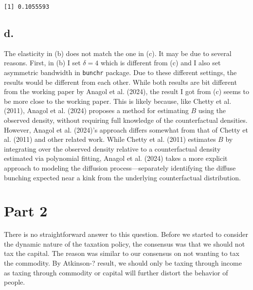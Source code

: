 \documentclass[
  letterpaper,
  DIV=11,
  numbers=noendperiod]{scrartcl}
\newenvironment{Shaded}{\begin{snugshade}}{\end{snugshade}}
\newcommand{\CommentTok}[1]{\textcolor[rgb]{0.37,0.37,0.37}{#1}}
\newcommand{\NormalTok}[1]{\textcolor[rgb]{0.00,0.23,0.31}{#1}}
\newcommand{\SpecialCharTok}[1]{\textcolor[rgb]{0.37,0.37,0.37}{#1}}
\begin{document}
\begin{Shaded}
\end{Shaded}

\begin{verbatim}
[1] 0.1055593
\end{verbatim}

\subsection{d.}\label{d.}

The elasticity in (b) does not match the one in (c). It may be due to
several reasons. First, in (b) I set \(\delta=4\) which is different
from (c) and I also set asymmetric bandwidth in \texttt{bunchr} package.
Due to these different settings, the results would be different from
each other. While both results are bit different from the working paper
by Anagol et al. (2024), the result I got from (c) seems to be more
close to the working paper. This is likely because, like Chetty et al.
(2011), Anagol et al. (2024) proposes a method for estimating \(B\)
using the observed density, without requiring full knowledge of the
counterfactual densities. However, Anagol et al. (2024)'s approach
differs somewhat from that of Chetty et al. (2011) and other related
work. While Chetty et al. (2011) estimates \(B\) by integrating over the
observed density relative to a counterfactual density estimated via
polynomial fitting, Anagol et al. (2024) takes a more explicit approach
to modeling the diffusion process---separately identifying the diffuse
bunching expected near a kink from the underlying counterfactual
distribution.

\section{Part 2}\label{part-2}

There is no straightforward answer to this question. Before we started
to consider the dynamic nature of the taxation policy, the consensus was
that we should not tax the capital. The reason was similar to our
consensus on not wanting to tax the commodity. By Atkinson-? result, we
should only be taxing through income as taxing through commodity or
capital will further distort the behavior of people.
\end{document}
